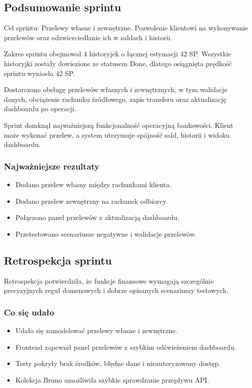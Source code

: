 \documentclass[12pt,a4paper]{article}
\begin{document}
\subsection*{Podsumowanie sprintu}
Cel sprintu: Przelewy własne i zewnętrzne. Pozwolenie klientowi na wykonywanie przelewów oraz odzwierciedlanie ich w saldach i historii.

Zakres sprintu obejmował 4 historyjek o łącznej estymacji 42 SP. Wszystkie historyjki zostały dowiezione ze statusem Done, dlatego osiągnięta prędkość sprintu wyniosła 42 SP.

Dostarczono obsługę przelewów własnych i zewnętrznych, w tym walidacje danych, obciążenie rachunku źródłowego, zapis transferu oraz aktualizację dashboardu po operacji.

Sprint domknął najważniejszą funkcjonalność operacyjną bankowości. Klient może wykonać przelew, a system utrzymuje spójność sald, historii i widoku dashboardu.

\subsubsection*{Najważniejsze rezultaty}
\begin{itemize}
\item Dodano przelew własny między rachunkami klienta.
\item Dodano przelew zewnętrzny na rachunek odbiorcy.
\item Połączono panel przelewów z aktualizacją dashboardu.
\item Przetestowano scenariusze negatywne i walidacje przelewów.
\end{itemize}

\subsection*{Retrospekcja sprintu}
Retrospekcja potwierdziła, że funkcje finansowe wymagają szczególnie precyzyjnych reguł domenowych i dobrze opisanych scenariuszy testowych.

\subsubsection*{Co się udało}
\begin{itemize}
\item Udało się zamodelować przelewy własne i zewnętrzne.
\item Frontend zapewnił panel przelewów z szybkim odświeżeniem dashboardu.
\item Testy pokryły brak środków, błędne dane i nieautoryzowany dostęp.
\item Kolekcja Bruno umożliwiła szybkie sprawdzanie przepływu API.
\end{itemize}
\end{document}
